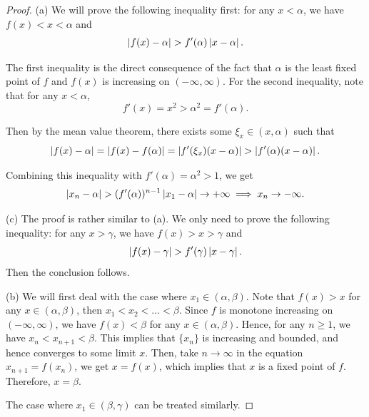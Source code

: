 \documentclass{article}
\begin{document}
\begin{proof}
  (a) We will prove the following inequality first: for any \( x<\alpha \), we have \( f(x)<x<\alpha \) and 
  \[ \abs{f(x)-\alpha}>f'(\alpha)\abs{x-\alpha}. \]\par
  The first inequality is the direct consequence of the fact that \( \alpha \) is the least fixed point of \( f \) and \( f(x) \) is increasing on \( (-\infty,\infty) \). For the second inequality, note that for any \( x<\alpha \),
  \[ f'(x)=x^2>\alpha^2=f'(\alpha). \]\par
  Then by the mean value theorem, there exists some \( \xi_x\in(x,\alpha) \) such that
  \[ \abs{f(x)-\alpha}=\abs{f(x)-f(\alpha)}=\abs{f'(\xi_x)(x-\alpha)}>\abs{f'(\alpha)(x-\alpha)}. \]\par
  Combining this inequality with \( f'(\alpha)=\alpha^2>1 \), we get
  \[ \abs{x_n-\alpha}>(f'(\alpha))^{n-1}\abs{x_1-\alpha}\to+\infty\implies x_n\to-\infty. \]\par
  (c) The proof is rather similar to (a). We only need to prove the following inequality: for any \( x>\gamma \), we have \( f(x)>x>\gamma \) and
  \[ \abs{f(x)-\gamma}>f'(\gamma)\abs{x-\gamma}. \]
  Then the conclusion follows.\par
  (b) We will first deal with the case where \( x_1\in(\alpha,\beta) \). Note that \( f(x)>x \) for any \( x\in(\alpha,\beta) \), then \( x_1<x_2<\dots<\beta \). Since \( f \) is monotone increasing on \( (-\infty,\infty) \), we have \( f(x)<\beta \) for any \( x\in(\alpha,\beta) \). Hence, for any \( n\ge 1 \), we have \( x_{n}<x_{n+1}<\beta \). This implies that \( \{x_n\} \) is increasing and bounded, and hence converges to some limit \( x \). Then, take \( n\to\infty \) in the equation \( x_{n+1}=f(x_n) \), we get \( x=f(x) \), which implies that \( x \) is a fixed point of \( f \). Therefore, \( x=\beta \).\par
  The case where \( x_1\in(\beta,\gamma) \) can be treated similarly. \end{proof}
\end{document}
